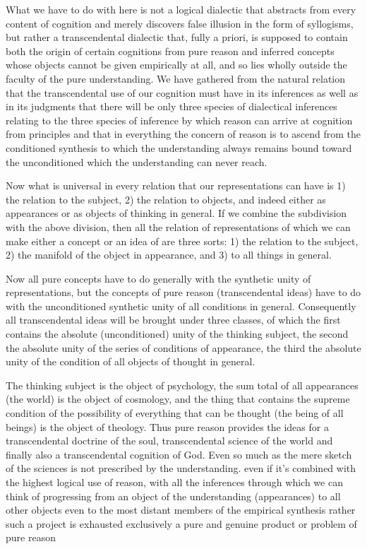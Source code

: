 \documentclass{article}
\begin{document}
What we have to do with here is not a logical dialectic
that abstracts from every content of cognition
and merely discovers false illusion in the form of syllogisms,
but rather a transcendental dialectic that, fully a priori,
is supposed to contain both the origin of certain cognitions from pure reason
and inferred concepts whose objects cannot be given empirically at all,
and so lies wholly outside the faculty of the pure understanding.
We have gathered from the natural relation that the transcendental use of our cognition
must have in its inferences as well as in its judgments that
there will be only three species of dialectical inferences
relating to the three species of inference
by which reason can arrive at cognition from principles
and that in everything the concern of reason is to ascend from the conditioned synthesis
to which the understanding always remains bound
toward the unconditioned which the understanding can never reach.

Now what is universal in every relation that our representations can have is
1) the relation to the subject,
2) the relation to objects,
and indeed  either as appearances or as objects of thinking in general.
If we combine the subdivision with the above division,
then all the relation of representations of which we can make 
either a concept or an idea of are three sorts:
1) the relation to the subject,
2) the manifold of the object in appearance, and
3) to all things in general.

Now all pure concepts have to do generally with the synthetic unity of representations,
but the concepts of pure reason (transcendental ideas) have to do with the
unconditioned synthetic unity of all conditions in general.
Consequently all transcendental ideas will be brought under three classes,
of which the first contains the absolute (unconditioned) unity of the thinking subject,
the second the absolute unity of the series of conditions of appearance, 
the third the absolute unity of the condition of all objects of thought in general.

The thinking subject is the object of psychology,
the sum total of all appearances (the world) is the object of cosmology,
and the thing that contains the supreme condition of 
the possibility of everything that can be thought
(the being of all beings) is the object of theology.
Thus pure reason provides the ideas for
a transcendental doctrine of the soul,
transcendental science of the world and
finally also a transcendental cognition of God.
Even so much as the mere sketch of the sciences is not prescribed by the understanding.
even if it's combined with the highest logical use of reason,
with all the inferences through which we can think of progressing from
an object of the understanding (appearances) to all other objects
even to the most distant members of the empirical synthesis
rather such a project is exhausted exclusively
a pure and genuine product or problem of pure reason
\end{document}
